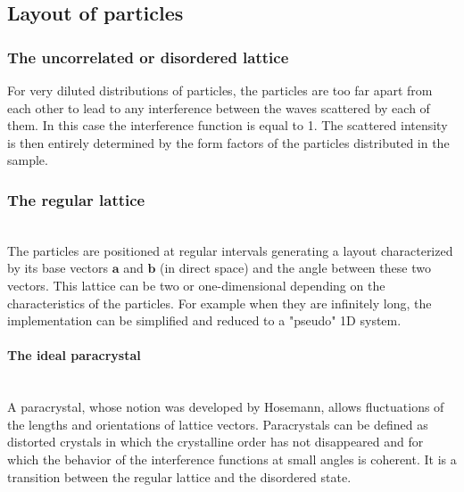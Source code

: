 

\subsection{Layout of particles}\label{sec:partlayout}

\subsubsection{The uncorrelated or disordered lattice}
For very diluted distributions of particles, the particles are too far apart from each other to lead to any interference between the waves scattered by each of them. In this case the interference function is equal to 1. The scattered intensity is then entirely determined by the form factors of the particles distributed in the sample.

\subsubsection{The regular  lattice}\mbox{}\\
The particles are positioned at regular intervals generating a layout characterized by its base vectors $\mathbf{a}$ and $\mathbf{b}$ (in direct space) and the angle between these two vectors.
This lattice can be two or one-dimensional depending on the characteristics of the particles. For example when they are infinitely long, the implementation can be simplified and reduced to a "pseudo" 1D system.

\paragraph{The ideal paracrystal} \mbox{}\\
A paracrystal, whose notion was developed by Hosemann\cite{Hos51}, allows fluctuations of the lengths and orientations of lattice vectors. Paracrystals can be defined as distorted crystals in which the crystalline order has not disappeared and for which the behavior of the interference functions  at small angles is coherent.
It is a transition between the regular lattice and the disordered state.\\

